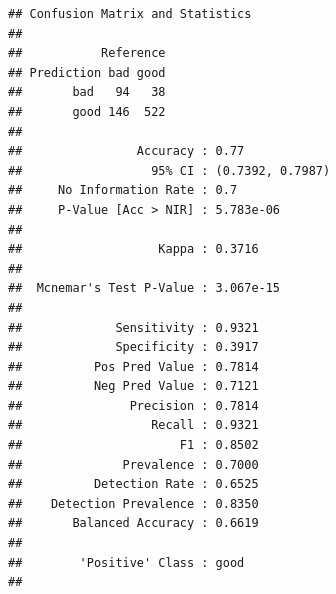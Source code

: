 \documentclass[
]{book}
\newenvironment{Shaded}{\begin{snugshade}}{\end{snugshade}}
\newcommand{\CommentTok}[1]{\textcolor[rgb]{0.56,0.35,0.01}{\textit{#1}}}
\newcommand{\DataTypeTok}[1]{\textcolor[rgb]{0.13,0.29,0.53}{#1}}
\newcommand{\KeywordTok}[1]{\textcolor[rgb]{0.13,0.29,0.53}{\textbf{#1}}}
\newcommand{\NormalTok}[1]{#1}
\newcommand{\OperatorTok}[1]{\textcolor[rgb]{0.81,0.36,0.00}{\textbf{#1}}}
\newcommand{\StringTok}[1]{\textcolor[rgb]{0.31,0.60,0.02}{#1}}
\begin{document}
\begin{Shaded}
\end{Shaded}

\begin{verbatim}
## Confusion Matrix and Statistics
## 
##           Reference
## Prediction bad good
##       bad   94   38
##       good 146  522
##                                           
##                Accuracy : 0.77            
##                  95% CI : (0.7392, 0.7987)
##     No Information Rate : 0.7             
##     P-Value [Acc > NIR] : 5.783e-06       
##                                           
##                   Kappa : 0.3716          
##                                           
##  Mcnemar's Test P-Value : 3.067e-15       
##                                           
##             Sensitivity : 0.9321          
##             Specificity : 0.3917          
##          Pos Pred Value : 0.7814          
##          Neg Pred Value : 0.7121          
##               Precision : 0.7814          
##                  Recall : 0.9321          
##                      F1 : 0.8502          
##              Prevalence : 0.7000          
##          Detection Rate : 0.6525          
##    Detection Prevalence : 0.8350          
##       Balanced Accuracy : 0.6619          
##                                           
##        'Positive' Class : good            
## 
\end{verbatim}

\begin{Shaded}
\end{Shaded}
\end{document}
